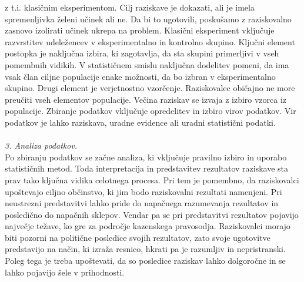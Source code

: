 \documentclass[12pt,a4paper]{amsart}
\theoremstyle{definition} %
\theoremstyle{plain} %
\begin{document}
z t.i. klasičnim eksperimentom. Cilj raziskave je dokazati, ali je imela spremenljivka želeni učinek ali ne. Da bi to ugotovili, poskušamo z 
raziskovalno zasnovo izolirati učinek ukrepa na problem. Klasični eksperiment vključuje razvrstitev udeležencev v eksperimentalno in kontrolno 
skupino. Ključni element postopka je naključna izbira, ki zagotavlja, da sta skupini primerljivi v vseh pomembnih vidikih. V statističnem smislu 
naključna dodelitev pomeni, da ima vsak član ciljne populacije enake možnosti, da bo izbran v eksperimentalno skupino. Drugi element je verjetnostno 
vzorčenje. Raziskovalec običajno ne more preučiti vseh elementov populacije. Večina raziskav se izvaja z izbiro vzorca iz populacije. Zbiranje podatkov 
vključuje opredelitev in izbiro virov podatkov. Vir podatkov je lahko raziskava, uradne evidence ali uradni statistični podatki.\\\\
\textit{3. Analiza podatkov.\\}
Po zbiranju podatkov se začne analiza, ki vključuje pravilno izbiro in uporabo statističnih metod. Toda interpretacija in predstavitev rezultatov raziskave 
sta prav tako ključna vidika celotnega procesa. Pri tem je pomembno, da raziskovalci upoštevajo ciljno občinstvo, ki jim bodo raziskovalni rezultati 
namenjeni. Pri neustrezni predstavitvi lahko pride do napačnega razumevanja rezultatov in posledično do napačnih sklepov. Vendar pa se pri predstavitvi 
rezultatov pojavijo največje težave, ko gre za področje kazenskega pravosodja. Raziskovalci morajo biti pozorni na politične posledice svojih rezultatov, zato 
svoje ugotovitve predstavijo na način, ki izraža resnico, hkrati pa je razumljiv in nepristranski. Poleg tega je treba upoštevati, da so posledice raziskav 
lahko dolgoročne in se lahko pojavijo šele v prihodnosti.

\end{document}
